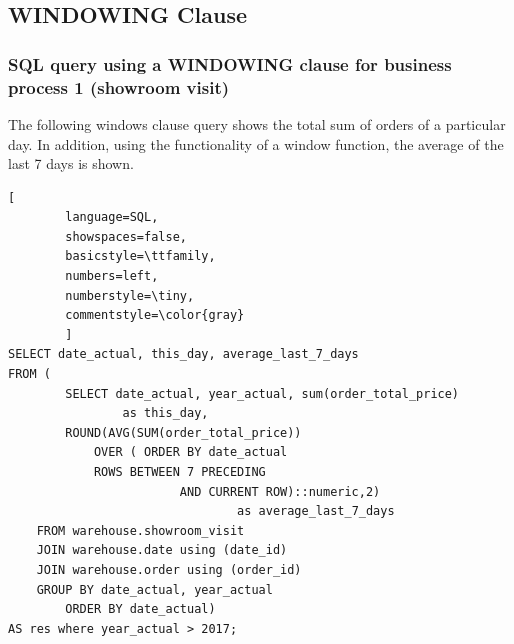 \documentclass[letterpaper,12pt]{article}
\begin{document}
\subsection{WINDOWING Clause}

\subsubsection{SQL query using a WINDOWING clause for business process 1 (showroom visit)}

The following windows clause query shows the total sum of orders of a particular day. In addition, using the functionality of a window function, the average of the last 7 days is shown.

\begin{lstlisting}[
        language=SQL,
        showspaces=false,
        basicstyle=\ttfamily,
        numbers=left,
        numberstyle=\tiny,
        commentstyle=\color{gray}
        ]																			   
SELECT date_actual, this_day, average_last_7_days	
FROM (
        SELECT date_actual, year_actual, sum(order_total_price) 
                as this_day, 
		ROUND(AVG(SUM(order_total_price))
			OVER ( ORDER BY date_actual
			ROWS BETWEEN 7 PRECEDING
                        AND CURRENT ROW)::numeric,2) 
                                as average_last_7_days
	FROM warehouse.showroom_visit
	JOIN warehouse.date using (date_id)
	JOIN warehouse.order using (order_id)
	GROUP BY date_actual, year_actual
        ORDER BY date_actual) 
AS res where year_actual > 2017;
\end{lstlisting}				  
\end{document}
